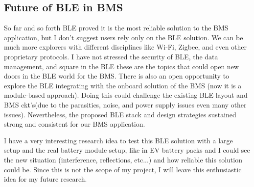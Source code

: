 \subsection*{Future of BLE in BMS}
So far and so forth BLE proved it is the most reliable solution to the BMS application, but I don't suggest users rely only on the BLE solution. We can be much more explorers with different disciplines like Wi-Fi, Zigbee, and even other proprietary protocols.
I have not stressed the security of BLE, the data management, and square in the BLE these are the topics that could open new doors in the BLE world for the BMS. There is also an open opportunity to explore the BLE integrating with the onboard solution of the BMS (now it is a module-based approach). Doing this could challenge the existing BLE layout and BMS ckt's(due to the parasitics, noise, and power supply issues even many other issues). Nevertheless, the proposed BLE stack and design strategies sustained strong and consistent for our BMS application.

I have a very interesting research idea to test this BLE solution with a large setup and the real battery module setup, like in EV battery packs and I could see the new situation (interference, reflections, etc...) and how reliable this solution could be. Since this is not the scope of my project, I will leave this enthusiastic idea for my future research.